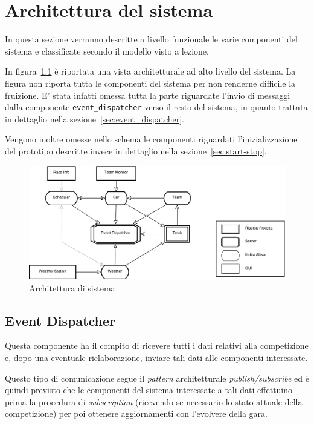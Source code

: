 \chapter{Architettura del sistema}
In questa sezione verranno descritte a livello funzionale le varie componenti del sistema e classificate secondo il modello visto a lezione.

In figura~\ref{fig:architettura} è riportata una vista architetturale ad alto livello del sistema. La figura non riporta tutta le componenti del sistema per non renderne difficile la fruizione. E' stata infatti omessa tutta la parte riguardate l'invio di messaggi dalla componente \texttt{event\_dispatcher} verso il resto del sistema, in quanto trattata in dettaglio nella sezione~\ref{sec:event_dispatcher}.

Vengono inoltre omesse nello schema le componenti riguardati l'inizializzazione del prototipo descritte invece in dettaglio nella sezione~\ref{sec:start-stop}.
\begin{landscape}
\begin{figure}
\includegraphics[height=.33\paperheight]{diagrammi/Arch}
\caption{Architettura di sistema}
\label{fig:architettura}
\end{figure}
\end{landscape}

\section{Event Dispatcher}
\label{text:eventDisp}
Questa componente ha il compito di ricevere tutti i dati relativi alla competizione e, dopo una eventuale rielaborazione, inviare tali dati alle componenti interessate.

Questo tipo di comunicazione segue il \textit{pattern} architetturale \textit{publish/subscribe} ed è quindi previsto che le componenti del sistema interessate a tali dati effettuino prima la procedura di \textit{subscription} (ricevendo se necessario lo stato attuale della competizione) per poi ottenere aggiornamenti con l'evolvere della gara.

